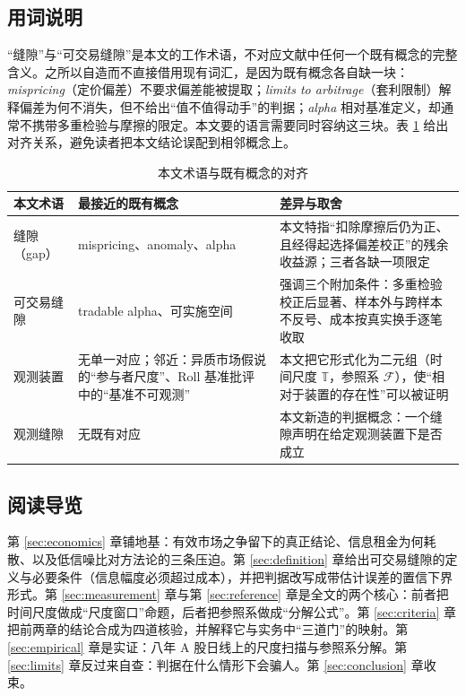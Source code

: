 \subsection{用词说明}

“缝隙”与“可交易缝隙”是本文的工作术语，不对应文献中任何一个既有概念的完整含义。之所以自造而不直接借用现有词汇，是因为既有概念各自缺一块：\emph{mispricing}（定价偏差）不要求偏差能被提取；\emph{limits to arbitrage}（套利限制）解释偏差为何不消失，但不给出“值不值得动手”的判据；\emph{alpha} 相对基准定义，却通常不携带多重检验与摩擦的限定。本文要的语言需要同时容纳这三块。表 \ref{tab:terms} 给出对齐关系，避免读者把本文结论误配到相邻概念上。

\begin{table}[htbp]
\centering
\caption{本文术语与既有概念的对齐}
\label{tab:terms}
\begin{tabular}{@{}>{\raggedright\arraybackslash}p{2.6cm}>{\raggedright\arraybackslash}p{4.2cm}>{\raggedright\arraybackslash}p{7.6cm}@{}}
\toprule
本文术语 & 最接近的既有概念 & 差异与取舍 \\
\midrule
缝隙（gap） & mispricing、anomaly、alpha & 本文特指“扣除摩擦后仍为正、且经得起选择偏差校正”的残余收益源；三者各缺一项限定 \\[0.3em]
可交易缝隙 & tradable alpha、可实施空间 & 强调三个附加条件：多重检验校正后显著、样本外与跨样本不反号、成本按真实换手逐笔收取 \\[0.3em]
观测装置 & 无单一对应；邻近：异质市场假说的“参与者尺度”、Roll 基准批评中的“基准不可观测” & 本文把它形式化为二元组（时间尺度 $\mathbb{T}$，参照系 $\mathcal{F}$），使“相对于装置的存在性”可以被证明 \\[0.3em]
观测缝隙 & 无既有对应 & 本文新造的判据概念：一个缝隙声明在给定观测装置下是否成立 \\
\bottomrule
\end{tabular}
\end{table}

\subsection{阅读导览}

第 \ref{sec:economics} 章铺地基：有效市场之争留下的真正结论、信息租金为何耗散、以及低信噪比对方法论的三条压迫。第 \ref{sec:definition} 章给出可交易缝隙的定义与必要条件（信息幅度必须超过成本），并把判据改写成带估计误差的置信下界形式。第 \ref{sec:measurement} 章与第 \ref{sec:reference} 章是全文的两个核心：前者把时间尺度做成“尺度窗口”命题，后者把参照系做成“分解公式”。第 \ref{sec:criteria} 章把前两章的结论合成为四道核验，并解释它与实务中“三道门”的映射。第 \ref{sec:empirical} 章是实证：八年 A 股日线上的尺度扫描与参照系分解。第 \ref{sec:limits} 章反过来自查：判据在什么情形下会骗人。第 \ref{sec:conclusion} 章收束。